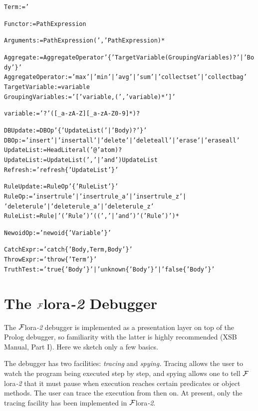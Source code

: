\documentclass[11pt]{article}
\newcommand{\FLORA}{{\mbox{\sc ${\cal F}${lora}\rm\emph{-2}}}\xspace}
\begin{document}
\begin{alltt}
Term := '%

Functor := PathExpression

Arguments := PathExpression (',' PathExpression)*

Aggregate := AggregateOperator '\{' TargetVariable (GroupingVariables)? '|' Body '\}'
AggregateOperator := 'max' | 'min' | 'avg' | 'sum' | 'collectset' | 'collectbag'
TargetVariable := variable
GroupingVariables := '[' variable, (',' variable)* ']'

variable := '?' ([_a-zA-Z][_a-zA-Z0-9]*)?

DBUpdate := DBOp '\{' UpdateList ('|' Body)? '\}'
DBOp := 'insert' | 'insertall' | 'delete' | 'deleteall' | 'erase' | 'eraseall'
UpdateList := HeadLiteral ('@' atom)?
UpdateList := UpdateList (',' | 'and') UpdateList
Refresh := 'refresh\{' UpdateList '\}'

RuleUpdate := RuleOp '\{' RuleList '\}'
RuleOp := 'insertrule' | 'insertrule_a' | 'insertrule_z' |
               'deleterule' | 'deleterule_a' | 'deleterule_z'
RuleList := Rule | '(' Rule ')'  ( (',' | 'and')  '(' Rule ')' )*

NewoidOp := 'newoid\{' Variable '\}'

CatchExpr := 'catch\{' Body, Term, Body '\}'
ThrowExpr := 'throw\{' Term '\}'
TruthTest := 'true\{' Body '\}' | 'unknown\{' Body '\}' | 'false\{' Body '\}'
\end{alltt}


\section{The \FLORA Debugger}\label{sec-debugger}


The \FLORA debugger is implemented as a presentation layer on top of the Prolog
debugger, so familiarity with the latter is highly recommended (XSB Manual,
Part I). Here we sketch only a few basics.

The debugger has two facilities: \emph{tracing} and \emph{spying.} Tracing
allows the user to watch the program being executed step by step, and
spying allows one to tell \FLORA that it must pause when execution reaches
certain predicates or object methods. The user can trace the execution from
then on. At present, only the tracing facility has been implemented in
\FLORA.
\end{document}
